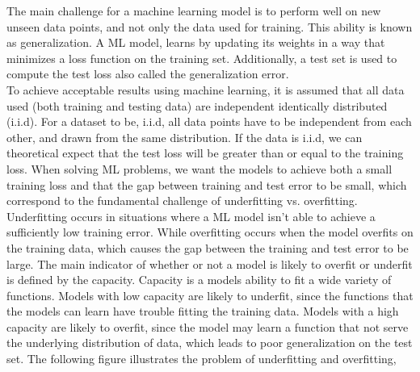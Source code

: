 \documentclass[11pt]{article}
\begin{document}
The main challenge for a machine learning model is to perform well on new unseen data points, and not only the data used for training. This ability is known as generalization. A ML model, learns by updating its weights in a way that minimizes a loss function on the training set. Additionally, a test set is used to compute the test loss also called the generalization error.
\\ 
To achieve acceptable results using machine learning, it is assumed that all data used (both training and testing data) are independent identically distributed (i.i.d). For a dataset to be, i.i.d, all data points have to be independent from each other, and drawn from the same distribution. If the data is i.i.d, we can theoretical expect that the test loss will be greater than or equal to the training loss. When solving ML problems, we want the models to achieve both a small training loss and that the gap between training and test error to be small, which correspond to the fundamental challenge of underfitting vs. overfitting. Underfitting occurs in situations where a ML model isn't able to achieve a sufficiently low training error. While overfitting occurs when the model overfits on the training data, which causes the gap between the training and test error to be large. The main indicator of whether or not a model is likely to overfit or underfit is defined by the capacity. Capacity is a models ability to fit a wide variety of functions. Models with low capacity are likely to underfit, since the functions that the models can learn have trouble fitting the training data. Models with a high capacity are likely to overfit, since the model may learn a function that not serve the underlying distribution of data, which leads to poor generalization on the test set. The following figure illustrates the problem of underfitting and overfitting,
\newpage
\end{document}
